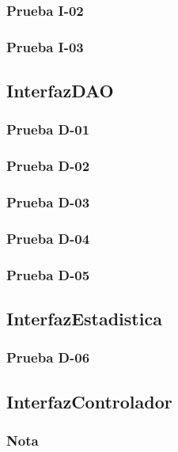 \documentclass[10pt,a4paper]{article}
\begin{document}
			\subsubsection{Prueba I-02}

			\subsubsection{Prueba I-03}

	\subsection{InterfazDAO}
			\subsubsection{Prueba D-01}

			\subsubsection{Prueba D-02}

			\subsubsection{Prueba D-03}

			\subsubsection{Prueba D-04}

			\subsubsection{Prueba D-05}

	\subsection{InterfazEstadistica}
			\subsubsection{Prueba D-06}

	\subsection{InterfazControlador}
			\subsubsection{Nota}
\end{document}
